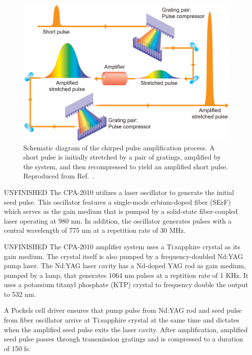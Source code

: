 \begin{figure}
	\centering
	\includegraphics[scale=0.35]{images/chapter_methods/cpa_process_service}
	\caption{Schematic diagram of the chirped pulse amplification process. A short pulse is initially stretched by a pair of gratings, amplified by the system, and then recompressed to yield an amplified short pulse. Reproduced from Ref.\ \cite{service154}.}
	\label{fig:cpa_process}
\end{figure}

{\color{red} UNFINISHED} The CPA-2010 utilizes a laser oscillator to generate the initial seed pulse. This oscillator features a single-mode erbium-doped fiber (SErF) which serves as the gain medium that is pumped by a solid-state fiber-coupled laser operating at 980 nm. In addition, the oscillator generates pulses with a central wavelength of 775 nm at a repetition rate of 30 MHz. 

{\color{red} UNFINISHED} The CPA-2010 amplifier system uses a Ti:sapphire crystal as its gain medium. The crystal itself is also pumped by a frequency-doubled Nd:YAG pump laser. The Nd:YAG laser cavity has a Nd-doped YAG rod as gain medium, pumped by a lamp, that generates 1064 nm pulses at a reptition rate of 1 KHz.  It uses a potassium titanyl phosphate (KTP) crystal to frequency double the output to 532 nm. 

A Pockels cell driver ensures that pump pulse from Nd:YAG rod and seed pulse from fiber oscillator arrive at Ti:sapphire crystal at the same time and dictates when the amplified seed pulse exits the laser cavity. After amplification, amplified seed pulse passes through transmission gratings and is compressed to a duration of 150 fs. 

